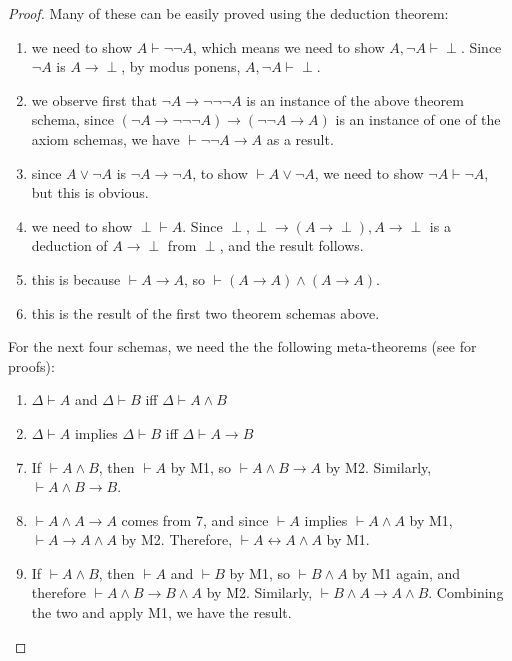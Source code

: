 \documentclass[12pt]{article}
\begin{document}
\begin{proof}  Many of these can be easily proved using the deduction theorem:
\begin{enumerate}
\item we need to show $A \vdash \neg \neg A$, which means we need to show $A,\neg A \vdash \perp$.  Since $\neg A$ is $A\to \perp$, by modus ponens, $A,\neg A \vdash \perp$.
\item we observe first that $\neg A \to \neg \neg \neg A$ is an instance of the above theorem schema, since $(\neg A \to \neg \neg \neg A) \to (\neg \neg A \to A)$ is an instance of one of the axiom schemas, we have $\vdash \neg \neg A \to A$ as a result.
\item since $A\lor \neg A$ is $\neg A \to \neg A$, to show $\vdash A \lor \neg A$, we need to show $\neg A \vdash \neg A$, but this is obvious.
\item we need to show $\perp \vdash A$.  Since $\perp, \perp \to (A\to \perp), A\to \perp$ is a deduction of $A\to \perp$ from $\perp$, and the result follows.
\item this is because $\vdash A\to A$, so $\vdash (A\to A)\land (A\to A)$.
\item this is the result of the first two theorem schemas above.
\end{enumerate}
For the next four schemas, we need the the following meta-theorems (see  for proofs):
\begin{multicols}{2}{
\begin{enumerate}[M1.]
\item $\Delta\vdash A$ and $\Delta\vdash B$ iff $\Delta\vdash A\land B$
\item $\Delta\vdash A$ implies $\Delta\vdash B$ iff $\Delta\vdash A\to B$
\end{enumerate}}
\end{multicols}
\begin{enumerate}
\setcounter{enumi}{6}
\item 
If $\vdash A\land B$, then $\vdash A$ by M1, so $\vdash A \land B \to A$ by M2.  Similarly, $\vdash A\land B \to B$.
\item 
$\vdash A\land A \to A$ comes from 7, and since $\vdash A$ implies $\vdash A\land A$ by M1, $\vdash A \to A\land A$ by M2.  Therefore, $\vdash A \leftrightarrow A\land A$ by M1.
\item 
If $\vdash A\land B$, then $\vdash A$ and $\vdash B$ by M1, so $\vdash B\land A$ by M1 again, and therefore $\vdash A\land B\to B\land A$ by M2.  Similarly, $\vdash B\land A\to A\land B$.  Combining the two and apply M1, we have the result.

\end{enumerate}
\end{proof}
\end{document}
